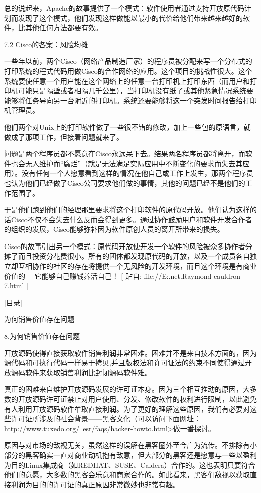 \documentclass[a4paper,12pt,UTF8,twoside]{ctexbook}
\begin{document}
总的说起来，Apache的故事提供了一个模式：软件使用者通过支持开放原代码计划而发现了这个模式，他们发现这样做能以最小的代价给他们带来越来越好的软件，比其他任何方法都要有效。


7.2 Cisco的各案：风险均摊


一些年以前，两个Cisco（网络产品制造厂家）的程序员被分配来写一个分布式的打印系统的程式代码用做Cisco的合作网络的应用。这个项目的挑战性很大。这个系统要使任意一个用户能在这个网络上的任意一台打印机上打印东西（而用户和打印机可能只是隔壁或者相隔几千公里），当打印机没有纸了或其他紧急情况系统要能够将任务导向另一台附近的打印机。系统还要能够将这一个突发时间报告给打印机管理员。


他们两个对Unix上的打印软件做了一些很不错的修改，加上一些包的原语言，就做成了那项工作，但接着问题就来了。


问题是两个程序员都不愿意在Cisco永远呆下去。结果两名程序员都将离开，而软件也会无人维护而“腐烂”（就是无法满足实际应用中不断变化的要求而失去其应用）。没有任何一个人愿意看到这样的情况在他自己或工作上发生，那两个程序员也认为他们已经做了Cisco公司要求他们做的事情，其他的问题已经不是他们的工作范围了。


于是他们跑到他们的经理那里要求将这个打印软件的原代码开放。他们认为这样的话Cisco不仅不会失去什么反而会得到更多。通过协作鼓励用户和软件开发合作者的组织的发展，Cisco能够弥补因为软件原创人员的离开所带来的损失。


Cisco的故事引出另一个模式：原代码开放使开发一个软件的风险被众多协作者分摊了而且投资分花费很小。所有的团体都发现原代码的开放，以及一个成员各自独立却互相协作的社区的存在将提供一个无风险的开发环境，而且这个环境是有商业价值的----它能够自己赚钱养活自己！
[ 贴自: file://E:\joyfire\joyfire.net\bible\Eric.Raymond\magic-cauldron-7.html ]

[目录]

为何销售价值存在问题

8.为何销售价值存在问题

开放源码使得直接获取软件销售利润非常困难。困难并不是来自技术方面的，因为源代码和可执行代码一样易于拷贝,并且版权法和许可证法的约束不同使得通过开放源码软件来获取销售利润比封闭源码软件难。


真正的困难来自维护开放源码发展的许可证本身。因为三个相互推动的原因，大多数的开放源码许可证禁止对用户使用、分发、修改软件的权利进行限制，以此避免有人利用开放源码软件牟取直接利润。为了更好的理解这些原因，我们有必要对这些许可证所涉及的社会背景——黑客文化（可以访问下面网址：http://www.tuxedo.org/~esr/faqs/hacker-howto.html>做一番探讨。


原因与对市场的敌视无关，虽然这样的误解在黑客圈外至今广为流传。不排除有小部分的黑客确实一直对商业动机抱有敌意，但大部分的黑客还是愿意与一些以盈利为目的Linux集成商（如REDHAT、SUSE、Caldera）合作的。这也表明只要符合他们的意愿，大多数的黑客会乐意和商家合作的。如此看来，黑客们敌视以获取直接利润为目的的许可证的真正原因非常微妙也非常有趣。
\end{document}

